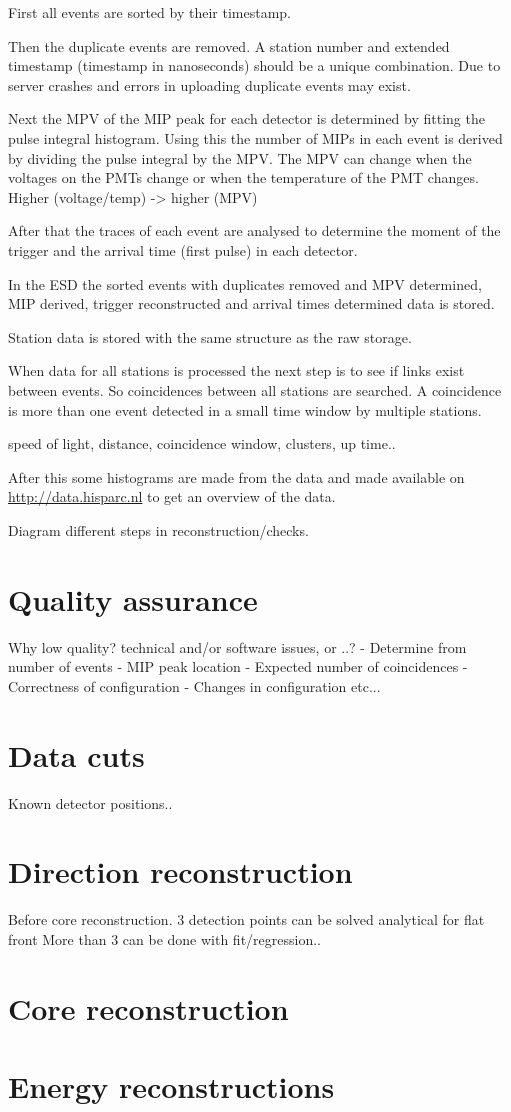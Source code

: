 First all events are sorted by their timestamp.

Then the duplicate events are removed. A station number and
extended timestamp (timestamp in nanoseconds) should be a unique
combination. Due to server crashes and errors in uploading duplicate
events may exist.

Next the MPV of the MIP peak for each detector is determined by fitting
the pulse integral histogram. Using this the number of MIPs in each
event is derived by dividing the pulse integral by the MPV. The MPV can
change when the voltages on the PMTs change or when the temperature of
the PMT changes. Higher (voltage/temp) -> higher (MPV)

After that the traces of each event are analysed to determine the moment
of the trigger and the arrival time (first pulse) in each detector.

In the ESD the sorted events with duplicates removed and MPV determined,
MIP derived, trigger reconstructed and arrival times determined data is
stored.

Station data is stored with the same structure as the raw storage.

When data for all stations is processed the next step is to see if links
exist between events. So coincidences between all stations are searched.
A coincidence is more than one event detected in a small time window by
multiple stations.

speed of light, distance, coincidence window, clusters, up time..

After this some histograms are made from the data and made available on
\url{http://data.hisparc.nl} to get an overview of the data.

Diagram different steps in reconstruction/checks.


\section{Quality assurance}


Why low quality? technical and/or software issues, or ..?
- Determine from number of events
- MIP peak location
- Expected number of coincidences
- Correctness of configuration
- Changes in configuration
etc...


\section{Data cuts}

Known detector positions..


\section{Direction reconstruction}

Before core reconstruction.
3 detection points can be solved analytical for flat front
More than 3 can be done with fit/regression..


\section{Core reconstruction}




\section{Energy reconstructions}

